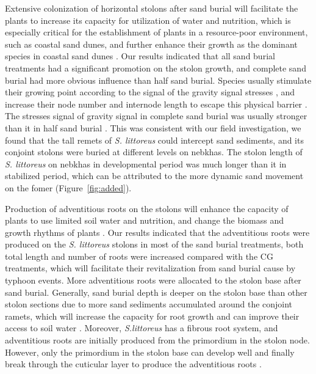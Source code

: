 \documentclass[]{interact}
\theoremstyle{plain}%
\theoremstyle{definition}
\theoremstyle{remark}
\begin{document}
Extensive colonization of horizontal stolons after sand burial will facilitate the plants to increase its capacity for utilization of water and nutrition, which is especially critical for the establishment of plants in a resource-poor environment, such as coastal sand dunes, and further enhance their growth as the dominant species in coastal sand dunes \citep{divyasreeEcologicalStudyReproduction,mendoza-gonzalezBiologicalFloraCoastal2014}. Our results indicated that all sand burial treatments had a significant promotion on the  stolon growth, and complete sand burial had more obvious influence than half sand burial. Species usually stimulate their growing point according to the signal of the gravity signal stresses \citep{zhouAnalysisgrowthstrategy2015}, and increase their node number and internode length to escape this physical barrier \citep{maunEffectsBurialSand1996}. The stresses signal of gravity signal in complete sand burial was usually stronger than it in half sand burial \citep{wangAdvancesStudiesMorphological2005}. This was consistent with our field investigation, we found that the tall remets of \textit{S. littoreus} could intercept sand sediments, and its conjoint stolons were buried at different levels on nebkhas. The stolon length of \textit{S. littoreus} on nebkhas in developmental period was much longer than it in stabilized period, which can be attributed to the more dynamic sand movement on the fomer (Figure~\ref{fig:added}). 

Production of adventitious roots on the stolons will enhance the capacity of plants to use limited soil water and nutrition, and change the biomass and growth rhythms of plants \citep{martinezResponsesDuneMosses1999,dechAdventitiousRootProduction2006}. Our results indicated that the adventitious roots were produced on the \textit{S. littoreus} stolons in most of the sand burial treatments, both total length and number of roots were increased compared with the CG treatments, which will facilitate their revitalization from sand burial cause by typhoon events. More adventitious roots were allocated to the stolon base after sand burial. Generally, sand burial depth is deeper on the stolon base than other stolon sections due to more sand sediments accumulated around the conjoint ramets, which will increase the capacity for root growth and can improve their access to soil water \citep{yuanEffectsSandAccretion1993}. Moreover, \textit{S.littoreus} has a fibrous root system, and adventitious roots are initially produced from the primordium in the stolon node. However, only the primordium in the stolon base can develop well and finally break through the cuticular layer to produce the adventitious roots \citep{hochholdingerWeedsCropsGenetic2004}. 
\end{document}
